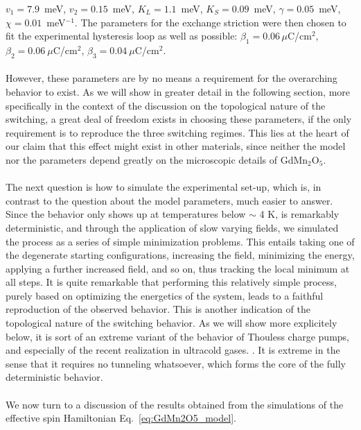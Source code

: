 $v_1 = 7.9$~meV, $v_2 = 0.15$~meV, $K_L = 1.1$~meV, $K_S = 0.09$~meV, $\gamma = 0.05$~meV, $\chi=0.01$~meV$^{-1}$.
The parameters for the exchange striction were then chosen to fit the experimental hysteresis loop as well as possible:
${\beta_1 = 0.06\,\mu}$C/cm$^2$, $\beta_2 = 0.06\:\mu$C/cm$^2$, $\beta_3 = 0.04\:\mu$C/cm$^2$.
\\\\
However, these parameters are by no means a requirement for the overarching behavior to exist. As we will show in greater detail in the following section, more specifically in the context of the discussion on the topological nature of the switching, a great deal of freedom exists in choosing these parameters, if the only requirement is to reproduce the three switching regimes.
This lies at the heart of our claim that this effect might exist in other materials, since neither the model nor the parameters depend greatly on the microscopic details of GdMn$_2$O$_5$. 
\\\\
The next question is how to simulate the experimental set-up, which is, in contrast to the question about the model parameters, much easier to answer.
Since the behavior only shows up at temperatures below $\sim$ 4 K, is remarkably deterministic, and through the application of slow varying fields, we simulated the process as a series of simple minimization problems.
This entails taking one of the degenerate starting configurations, increasing the field, minimizing the energy, applying a further increased field, and so on, thus tracking the local minimum at all steps.
It is quite remarkable that performing this relatively simple process, purely based on optimizing the energetics of the system, leads to a faithful reproduction of the observed behavior.
This is another indication of the topological nature of the switching behavior.
As we will show more explicitely below, it is sort of an extreme variant of the behavior of Thouless charge pumps, and especially of the recent realization in ultracold gases. \cite{Rice82,Thouless1982,Thouless83,Lohse16,Nakajima16, Atala13}.
It is extreme in the sense that it requires no tunneling whatsoever, which forms the core of the fully deterministic behavior.
\\\\

We now turn to a discussion of the results obtained from the simulations of the effective spin Hamiltonian Eq.~\eqref{eq:GdMn2O5_model}.

